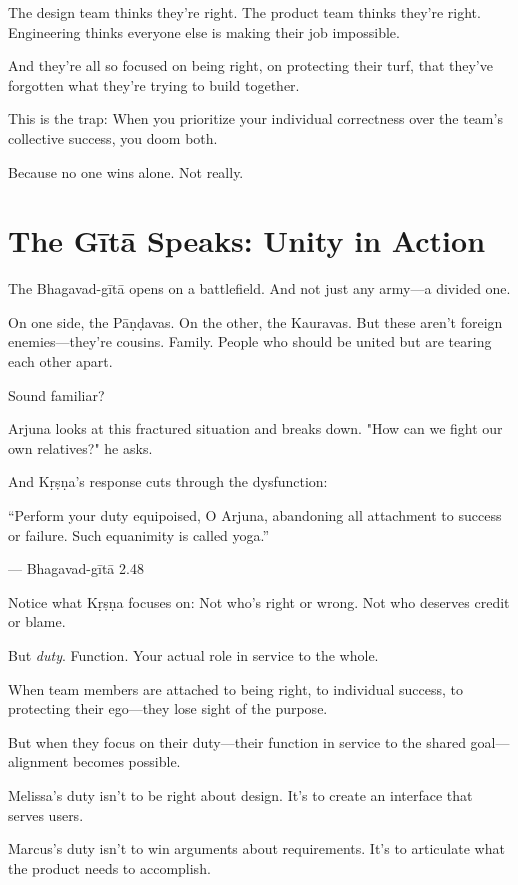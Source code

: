 \documentclass[11pt,twoside]{book}
\begin{document}
The design team thinks they're right. The product team thinks they're right. Engineering thinks everyone else is making their job impossible.

And they're all so focused on being right, on protecting their turf, that they've forgotten what they're trying to build together.

This is the trap: When you prioritize your individual correctness over the team's collective success, you doom both.

Because no one wins alone. Not really.

\section*{The Gītā Speaks: Unity in Action}

The Bhagavad-gītā opens on a battlefield. And not just any army—a divided one.

On one side, the Pāṇḍavas. On the other, the Kauravas. But these aren't foreign enemies—they're cousins. Family. People who should be united but are tearing each other apart.

Sound familiar?

Arjuna looks at this fractured situation and breaks down. "How can we fight our own relatives?" he asks.

And Kṛṣṇa's response cuts through the dysfunction:

\begin{pullquote}
``Perform your duty equipoised, O Arjuna, abandoning all attachment to success or failure. Such equanimity is called yoga.''

--- Bhagavad-gītā 2.48
\end{pullquote}

Notice what Kṛṣṇa focuses on: Not who's right or wrong. Not who deserves credit or blame.

But \emph{duty}. Function. Your actual role in service to the whole.

When team members are attached to being right, to individual success, to protecting their ego—they lose sight of the purpose.

But when they focus on their duty—their function in service to the shared goal—alignment becomes possible.

Melissa's duty isn't to be right about design. It's to create an interface that serves users.

Marcus's duty isn't to win arguments about requirements. It's to articulate what the product needs to accomplish.
\end{document}
